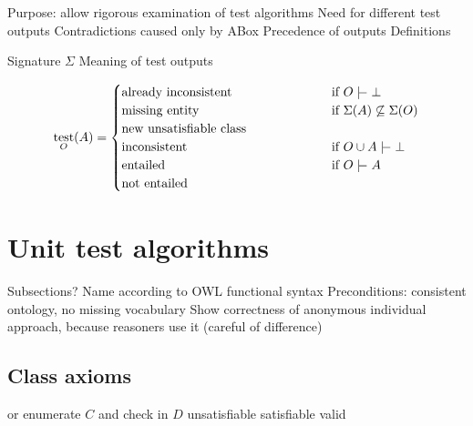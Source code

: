 \documentclass[draft]{sig-alternate}
\newcommand{\union}{\cup}
\newcommand{\sementails}{\mathrel{|}\joinrel\mkern-.5mu\mathrel{-}}
\newcommand{\signature}{\Sigma}
\DeclareMathOperator{\test}{test}
\newcommand{\casesbox}[2][.45\linewidth]{\parbox[t]{#1}{\hangindent=1em\relax#2}}
\begin{document}
\begin{todos}
  \todo Purpose: allow rigorous examination of test algorithms
  \todo Need for different test outputs
  \todo Contradictions caused only by ABox
  \todo Precedence of outputs
  \todo Definitions
  \begin{todos}
    \todo Signature $\signature$
    \todo Meaning of test outputs
  \end{todos}
\end{todos}

\begin{description}
  \item[]
\end{description}

\[
  \test_O(A) =
  \begin{cases}
    \casesbox{already inconsistent} &
      \text{if } O \sementails \bot \\
    \casesbox{missing entity} &
      \text{if } \signature(A) \not\subseteq \signature(O) \\
    \casesbox{new unsatisfiable class} & \\
    \casesbox{inconsistent} &
      \text{if } O \union A \sementails \bot \\
    \casesbox{entailed} &
      \text{if } O \sementails A \\
    \casesbox{not entailed} & \\
  \end{cases}
\]

\section{Unit test algorithms}

\begin{todos}
  \todo Subsections?
  \todo Name according to OWL functional syntax
  \todo Preconditions: consistent ontology, no missing vocabulary
  \todo Show correctness of anonymous individual approach, because reasoners use it (careful of difference)
\end{todos}

\subsection{Class axioms}

\begin{algorithm}[H]
  \caption{}
  \begin{algorithmic}[1]
        \Comment or enumerate $C$ and check in $D$
        \State \Return unsatisfiable
        \State \Return satisfiable
      \Else
        \State \Return valid
      \EndIf
    \EndFunction
  \end{algorithmic}
\end{algorithm}
\end{document}
